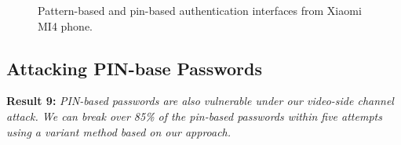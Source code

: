         \begin{figure}[!t]
            \centering
            \hspace{0.2cm}
            \caption{Pattern-based and pin-based authentication interfaces from Xiaomi MI4 phone.}
            \label{fig:unlock interface}
        \end{figure}

    \subsection{Attacking PIN-base Passwords}
        \noindent \textbf{Result 9:} \emph{PIN-based passwords are also
        vulnerable under our video-side channel attack. We can break
        over 85\% of the pin-based passwords within five attempts using a
        variant method based on our approach.}

